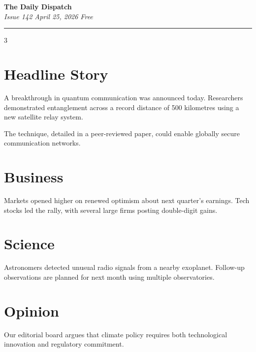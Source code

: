 \documentclass[10pt]{article}
\begin{document}
\begin{center}
\textbf{\Huge The Daily Dispatch}\\[0.2cm]
\textit{Issue 142 \hfill April 25, 2026 \hfill Free}
\end{center}

\hrule
\vspace{0.3cm}

\begin{multicols}{3}

\section*{Headline Story}
A breakthrough in quantum communication was announced today. Researchers demonstrated entanglement across a record distance of 500 kilometres using a new satellite relay system.

The technique, detailed in a peer-reviewed paper, could enable globally secure communication networks.

\section*{Business}
Markets opened higher on renewed optimism about next quarter's earnings. Tech stocks led the rally, with several large firms posting double-digit gains.

\section*{Science}
Astronomers detected unusual radio signals from a nearby exoplanet. Follow-up observations are planned for next month using multiple observatories.

\section*{Opinion}
Our editorial board argues that climate policy requires both technological innovation and regulatory commitment.

\end{multicols}
\end{document}
